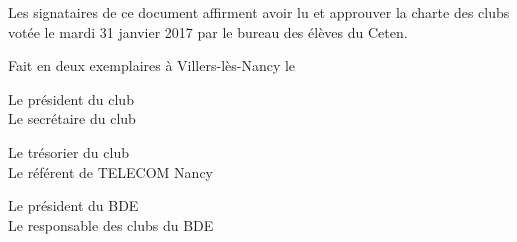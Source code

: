 \documentclass{article}
\begin{document}

	Les signataires de ce document affirment avoir lu et approuver la charte des
	clubs votée le mardi 31 janvier 2017 par le bureau des élèves du Ceten.

	Fait en deux exemplaires à Villers-lès-Nancy le \underline{\hspace{5cm}}
	\vfill

	\begin{multicols}{2}
		Le président du club \\
		Le secrétaire du club 
	\end{multicols}
		\vspace*{4cm}
	\begin{multicols}{2}
		Le trésorier du club \\
		Le référent de TELECOM Nancy 
	\end{multicols}
		\vspace*{4cm}
	\begin{multicols}{2}
		Le président du BDE \\
		Le responsable des clubs du BDE 
	\end{multicols}
		\vspace*{4cm}
\end{document}
